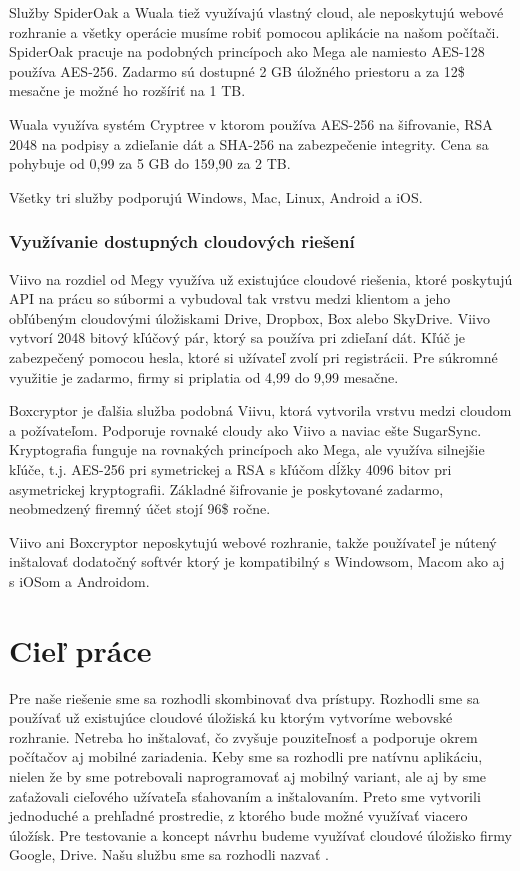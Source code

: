 		Služby SpiderOak \cite{spideroak} a Wuala \cite{wuala} tiež využívajú vlastný cloud, ale neposkytujú webové rozhranie a všetky operácie musíme robiť pomocou aplikácie na našom počítači. SpiderOak pracuje na podobných princípoch ako Mega ale namiesto AES-128 používa AES-256. Zadarmo sú dostupné 2 GB úložného priestoru a za 12\$ mesačne je možné ho rozšíriť na 1 TB.
		
		 Wuala využíva systém Cryptree \cite{cryptree} v ktorom používa AES-256 na šifrovanie, RSA 2048 na podpisy a zdieľanie dát a SHA-256 na zabezpečenie integrity. Cena sa pohybuje od 0,99 \EUR{} za 5 GB do 159,90 \EUR{} za 2 TB.
		 
		 Všetky tri služby podporujú Windows, Mac, Linux, Android a iOS.
		
	\subsubsection{Využívanie dostupných cloudových riešení}
		Viivo \cite{viivo} na rozdiel od Megy využíva už existujúce cloudové riešenia, ktoré poskytujú API na prácu so súbormi a vybudoval tak vrstvu medzi klientom a jeho obľúbeným cloudovými úložiskami Drive, Dropbox, Box alebo SkyDrive. Viivo vytvorí 2048 bitový kľúčový pár, ktorý sa používa pri zdieľaní dát. Kľúč je zabezpečený pomocou hesla, ktoré si užívateľ zvolí pri registrácii. Pre súkromné využitie je zadarmo, firmy si priplatia od 4,99 do 9,99 mesačne.
		
		Boxcryptor \cite{boxcryptor} je ďalšia služba podobná Viivu, ktorá vytvorila vrstvu medzi cloudom a požívateľom. Podporuje rovnaké cloudy ako Viivo a naviac ešte SugarSync. Kryptografia funguje na rovnakých princípoch ako Mega, ale využíva silnejšie kľúče, t.j. AES-256 pri symetrickej a RSA s kľúčom dĺžky 4096 bitov pri asymetrickej kryptografii. Základné šifrovanie je poskytované zadarmo, neobmedzený firemný účet stojí 96\$ ročne.
		
		Viivo ani Boxcryptor neposkytujú webové rozhranie, takže používateľ je nútený inštalovať dodatočný softvér ktorý je kompatibilný s Windowsom, Macom ako aj s iOSom a Androidom.

\section{Cieľ práce}
	Pre naše riešenie sme sa rozhodli skombinovať dva prístupy. Rozhodli sme sa používať už existujúce cloudové úložiská ku ktorým vytvoríme webovské rozhranie. Netreba ho inštalovať, čo zvyšuje pouziteľnosť a podporuje okrem počítačov aj mobilné zariadenia. Keby sme sa rozhodli pre natívnu aplikáciu, nielen že by sme potrebovali naprogramovať aj mobilný variant, ale aj by sme zaťažovali cieľového užívateľa sťahovaním a inštalovaním. Preto sme vytvorili jednoduché a prehľadné prostredie, z ktorého bude možné využívať viacero úložísk. Pre testovanie a koncept návrhu budeme využívať cloudové úložisko firmy Google, Drive. Našu službu sme sa rozhodli nazvať \serviceName.

